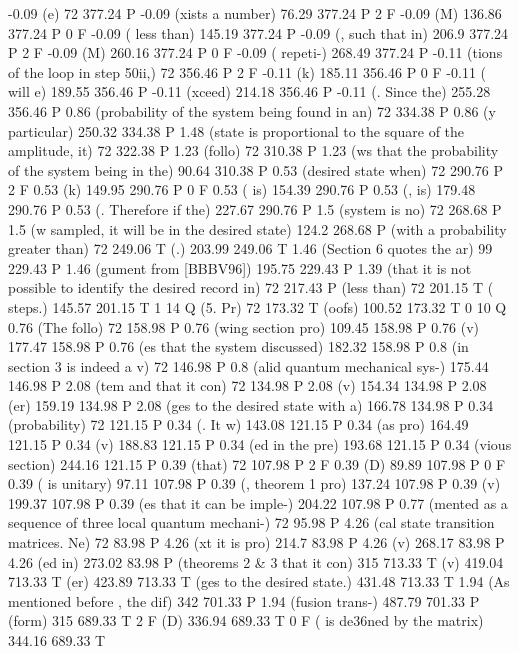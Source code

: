 -0.09 (e) 72 377.24 P
-0.09 (xists a number) 76.29 377.24 P
2 F
-0.09 (M) 136.86 377.24 P
0 F
-0.09 ( less than) 145.19 377.24 P
-0.09 (, such that in) 206.9 377.24 P
2 F
-0.09 (M) 260.16 377.24 P
0 F
-0.09 ( repeti-) 268.49 377.24 P
-0.11 (tions of the loop in step \050ii,) 72 356.46 P
2 F
-0.11 (k) 185.11 356.46 P
0 F
-0.11 ( will e) 189.55 356.46 P
-0.11 (xceed) 214.18 356.46 P
-0.11 (. Since the) 255.28 356.46 P
0.86 (probability of the system being found in an) 72 334.38 P
0.86 (y particular) 250.32 334.38 P
1.48 (state is proportional to the square of the amplitude, it) 72 322.38 P
1.23 (follo) 72 310.38 P
1.23 (ws that the probability of the system being in the) 90.64 310.38 P
0.53 (desired state when) 72 290.76 P
2 F
0.53 (k) 149.95 290.76 P
0 F
0.53 ( is) 154.39 290.76 P
0.53 (, is) 179.48 290.76 P
0.53 (. Therefore if the) 227.67 290.76 P
1.5 (system is no) 72 268.68 P
1.5 (w sampled, it will be in the desired state) 124.2 268.68 P
(with a probability greater than) 72 249.06 T
(.) 203.99 249.06 T
1.46 (Section 6 quotes the ar) 99 229.43 P
1.46 (gument from [BBBV96]) 195.75 229.43 P
1.39 (that it is not possible to identify the desired record in) 72 217.43 P
(less than) 72 201.15 T
( steps.) 145.57 201.15 T
1 14 Q
(5. Pr) 72 173.32 T
(oofs) 100.52 173.32 T
0 10 Q
0.76 (The follo) 72 158.98 P
0.76 (wing section pro) 109.45 158.98 P
0.76 (v) 177.47 158.98 P
0.76 (es that the system discussed) 182.32 158.98 P
0.8 (in section 3 is indeed a v) 72 146.98 P
0.8 (alid quantum mechanical sys-) 175.44 146.98 P
2.08 (tem and that it con) 72 134.98 P
2.08 (v) 154.34 134.98 P
2.08 (er) 159.19 134.98 P
2.08 (ges to the desired state with a) 166.78 134.98 P
0.34 (probability) 72 121.15 P
0.34 (. It w) 143.08 121.15 P
0.34 (as pro) 164.49 121.15 P
0.34 (v) 188.83 121.15 P
0.34 (ed in the pre) 193.68 121.15 P
0.34 (vious section) 244.16 121.15 P
0.39 (that) 72 107.98 P
2 F
0.39 (D) 89.89 107.98 P
0 F
0.39 ( is unitary) 97.11 107.98 P
0.39 (, theorem 1 pro) 137.24 107.98 P
0.39 (v) 199.37 107.98 P
0.39 (es that it can be imple-) 204.22 107.98 P
0.77 (mented as a sequence of three local quantum mechani-) 72 95.98 P
4.26 (cal state transition matrices. Ne) 72 83.98 P
4.26 (xt it is pro) 214.7 83.98 P
4.26 (v) 268.17 83.98 P
4.26 (ed in) 273.02 83.98 P
(theorems 2 & 3 that it con) 315 713.33 T
(v) 419.04 713.33 T
(er) 423.89 713.33 T
(ges to the desired state.) 431.48 713.33 T
1.94 (As mentioned before , the dif) 342 701.33 P
1.94 (fusion trans-) 487.79 701.33 P
(form) 315 689.33 T
2 F
(D) 336.94 689.33 T
0 F
( is de\336ned by the matrix) 344.16 689.33 T
